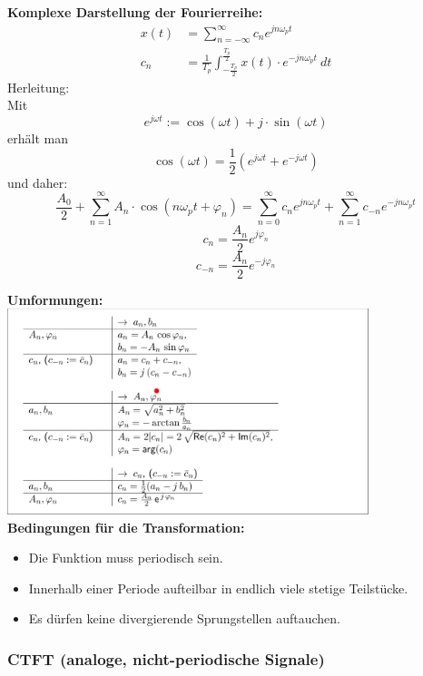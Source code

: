 \documentclass[12pt,a4paper]{scrartcl}
\begin{document}
  \noindent \textbf{Komplexe Darstellung der Fourierreihe:}
  \begin{equation}
    \label{eq:3}
    \begin{split}
    x(t) &= \sum_{n= -\infty}^{\infty} c_n e^{jn\omega_p t}\\
    c_n &= \frac{1}{T_p} \int_{-\frac{T_p}{2}}^{\frac{T_p}{2}} x(t) \cdot e^{-jn\omega_p t}\ dt
    \end{split}
  \end{equation}
  \noindent Herleitung: \\
  Mit 
  $$e^{j\omega t} := \cos(\omega t) + j\cdot \sin(\omega t)$$ erhält man $$\cos(\omega t) = \frac{1}{2}(e^{j\omega t} +  e^{-j\omega t})$$ 
  und daher:
  $$\frac{A_0}{2} + \sum_{n=1}^{\infty} A_n \cdot \cos(n \omega_p t + \varphi_n) =  \sum_{n=0}^{\infty}c_n e^{jn\omega_p t} +  \sum_{n=1}^{\infty}c_{-n}e^{-jn\omega_p t}$$
  $$c_n = \frac{A_n}{2} e^{j\varphi_n}$$
  $$ c_{-n} = \frac{A_n}{2} e^{-j\varphi_n}$$ 

  \noindent \textbf{Umformungen:}\\
  \includegraphics[height=6cm]{Pictures/Umformung.png} \\

  \noindent \textbf{Bedingungen für die Transformation:} 
  \begin{itemize}
  \item Die Funktion muss periodisch sein.
  \item  Innerhalb einer Periode aufteilbar in endlich viele stetige Teilstücke.
  \item Es dürfen keine divergierende Sprungstellen auftauchen.
  \end{itemize}

  \subsubsection{CTFT (analoge, nicht-periodische Signale)}
  \label{sec:sub:sub:ctft}
\end{document}
